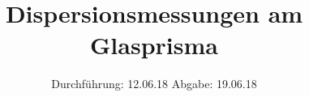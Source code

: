 

\subject{V402}
\title{Dispersionsmessungen am Glasprisma}
\date{%
  Durchführung: 12.06.18
  \hspace{3em}
  Abgabe: 19.06.18
}



\maketitle
\thispagestyle{empty}
\tableofcontents
\newpage






\printbibliography{}


